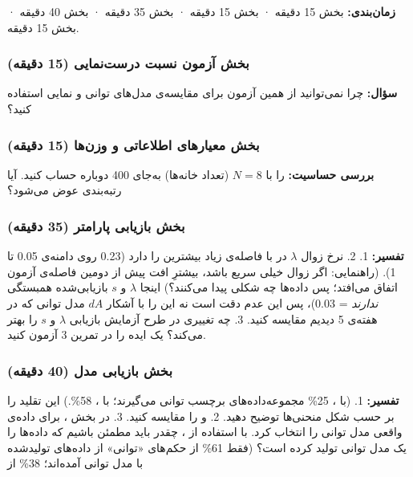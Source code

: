 \textbf{زمان‌بندی:} بخش  15 دقیقه · بخش  15 دقیقه · بخش
 35 دقیقه · بخش  40 دقیقه · بخش  15 دقیقه.

\subsubsection{\texorpdfstring{بخش  آزمون نسبت درست‌نمایی (15
دقیقه)}{بخش A: آزمون نسبت درست‌نمایی (15 دقیقه)}}

\textbf{سؤال:} چرا نمی‌توانید از همین آزمون برای مقایسه‌ی مدل‌های توانی و
نمایی استفاده کنید؟

\subsubsection{\texorpdfstring{بخش  معیارهای اطلاعاتی و وزن‌ها (15
دقیقه)}{بخش B: معیارهای اطلاعاتی و وزن‌ها (15 دقیقه)}}

\textbf{بررسی حساسیت:}  را با \(N = 8\) (تعداد خانه‌ها) به‌جای 400
دوباره حساب کنید. آیا رتبه‌بندی عوض می‌شود؟

\subsubsection{\texorpdfstring{بخش  بازیابی پارامتر (35
دقیقه)}{بخش C: بازیابی پارامتر (35 دقیقه)}}

\textbf{تفسیر:} 1. 2. نرخ زوال \(\lambda\) در  با فاصله‌ی
زیاد بیشترین  را دارد (0.23 روی دامنه‌ی 0.05 تا 1). (راهنمایی:
اگر زوال خیلی سریع باشد، بیشترِ افت پیش از دومین فاصله‌ی آزمون اتفاق
می‌افتد؛ پس داده‌ها چه شکلی پیدا می‌کنند؟) اینجا \(\lambda\) و \(s\)
بازیابی‌شده همبستگی \emph{ندارند}  = 0.03)، پس این عدم دقت است نه
 این را با  آشکار \(A\)\lr{--}\(d\) مدل توانی که
در هفته‌ی 5 دیدیم مقایسه کنید. 3. چه تغییری در طرح آزمایش بازیابی
\(\lambda\) و \(s\) را بهتر می‌کند؟ یک ایده را در تمرین 3 آزمون کنید.

\subsubsection{\texorpdfstring{بخش  بازیابی مدل (40
دقیقه)}{بخش D: بازیابی مدل (40 دقیقه)}}

\textbf{تفسیر:} 1. (با ، 25\% مجموعه‌داده‌های  برچسب
توانی می‌گیرند؛ با ، 58\%.) این تقلید را بر حسب شکل منحنی‌ها توضیح
دهید. 2.  و  را مقایسه کنید. 3. در بخش ، 
برای داده‌ی واقعی مدل توانی را انتخاب کرد. با استفاده از
\textbf{} ، چقدر باید مطمئن باشیم که داده‌ها
را یک مدل توانی تولید کرده است؟ (فقط 61\% از حکم‌های «توانی»  از
داده‌های تولیدشده با مدل توانی آمده‌اند؛ 38\% از 


